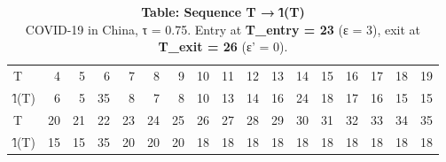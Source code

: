 \begin{table}[t]
\caption*{
{\large \textbf{Table: Sequence T → l̂(T)}} \\ 
{\small COVID-19 in China, τ = 0.75. Entry at \textbf{T\_entry = 23} (ε = 3), exit at \textbf{T\_exit = 26} (ε' = 0).}
} 
\begin{tabular*}{\linewidth}{@{\extracolsep{\fill}}lrrrrrrrrrrrrrrrr}
\toprule
 &  &  &  &  &  &  &  &  &  &  &  &  &  &  &  &  \\ 
\midrule\addlinespace[2.5pt]
T & 4 & 5 & 6 & 7 & 8 & 9 & 10 & 11 & 12 & 13 & 14 & 15 & 16 & 17 & 18 & 19 \\ 
l̂(T) & 6 & 5 & 35 & 8 & 7 & 8 & 10 & 13 & 14 & 16 & 24 & 18 & 17 & 16 & 15 & 15 \\ 
T & 20 & 21 & 22 & 23 & 24 & 25 & 26 & 27 & 28 & 29 & 30 & 31 & 32 & 33 & 34 & 35 \\ 
l̂(T) & 15 & 15 & 35 & 20 & 20 & 20 & 18 & 18 & 18 & 18 & 18 & 18 & 18 & 18 & 18 & 18 \\ 
\bottomrule
\end{tabular*}
\end{table}

